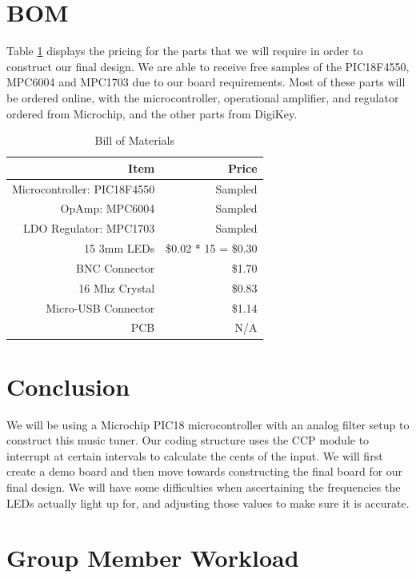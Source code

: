 \documentclass[12pt]{article}
\begin{document}
\section{BOM}
Table \ref{bom} displays the pricing for the parts that we will require in order to construct our final design. We are able to
receive free samples of the PIC18F4550, MPC6004 and MPC1703 due to our board requirements. Most of these parts will be ordered online,
with the microcontroller, operational amplifier, and regulator ordered from Microchip, and the other parts from DigiKey. 
\begin{table}[!h]
   \centering
    \begin{tabular}{|r|r|}
        \hline
	Item & Price \\ \hline
	Microcontroller: PIC18F4550 & Sampled \\ \hline
	OpAmp: MPC6004 & Sampled \\ \hline
	LDO Regulator: MPC1703 & Sampled \\ \hline
	15 3mm  LEDs & \$0.02 * 15 = \$0.30 \\ \hline
	BNC Connector & \$1.70 \\ \hline
	16 Mhz Crystal & \$0.83 \\ \hline
	Micro-USB Connector & \$1.14 \\ \hline
	PCB & N/A \\ \hline
	
    \end{tabular}
	\caption{Bill of Materials}
	\label{bom} 
\end{table}


\section{Conclusion}
We will be using a Microchip PIC18 microcontroller with an analog filter setup to
construct this music tuner. Our coding structure uses the CCP module to interrupt at
certain intervals to calculate the cents of the input. We will first create a demo board
and then move towards constructing the final board for our final design. We will have some
difficulties when ascertaining the frequencies the LEDs actually light up for, and adjusting 
those values to make sure it is accurate.

\section{Group Member Workload}
\end{document}
